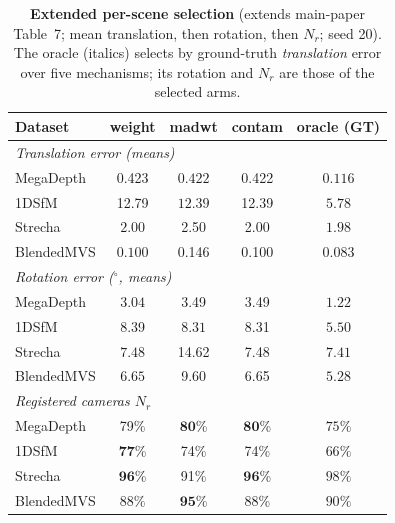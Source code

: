 \documentclass[10pt,twocolumn,letterpaper]{article}
\renewcommand{\deg}{^{\circ}}
\begin{document}
\begin{table}[t]\centering\footnotesize
\caption{\textbf{Extended per-scene selection} (extends main-paper Table~7; mean
translation, then rotation, then $N_r$; seed 20). The oracle (italics) selects by
ground-truth \emph{translation} error over five mechanisms; its rotation and $N_r$ are
those of the selected arms.}
\label{tab:x_selector}
\setlength{\tabcolsep}{3pt}%
\begin{tabular}{lcccc}
\toprule
Dataset & weight & madwt & contam & oracle (GT)\\
\midrule
\multicolumn{5}{l}{\emph{Translation error (means)}}\\[1pt]
MegaDepth  & 0.423 & $\mathbf{0.422}$ & 0.422 & $\mathit{0.116}$\\
1DSfM      & 12.79 & $\mathbf{12.39}$ & 12.39 & $\mathit{5.78}$\\
Strecha    & $\mathbf{2.00}$ & 2.50 & 2.00 & $\mathit{1.98}$\\
BlendedMVS & $\mathbf{0.100}$ & 0.146 & 0.100 & $\mathit{0.083}$\\
\midrule
\multicolumn{5}{l}{\emph{Rotation error ($\deg$, means)}}\\[1pt]
MegaDepth  & $\mathbf{3.04}$ & 3.49 & 3.49 & $\mathit{1.22}$\\
1DSfM      & 8.39 & $\mathbf{8.31}$ & 8.31 & $\mathit{5.50}$\\
Strecha    & $\mathbf{7.48}$ & 14.62 & 7.48 & $\mathit{7.41}$\\
BlendedMVS & $\mathbf{6.65}$ & 9.60 & 6.65 & $\mathit{5.28}$\\
\midrule
\multicolumn{5}{l}{\emph{Registered cameras $N_r$}}\\[1pt]
MegaDepth  & 79\% & $\mathbf{80}$\% & $\mathbf{80}$\% & $\mathit{75\%}$\\
1DSfM      & $\mathbf{77}$\% & 74\% & 74\% & $\mathit{66\%}$\\
Strecha    & $\mathbf{96}$\% & 91\% & $\mathbf{96}$\% & $\mathit{98\%}$\\
BlendedMVS & 88\% & $\mathbf{95}$\% & 88\% & $\mathit{90\%}$\\
\bottomrule
\end{tabular}
\end{table}
\end{document}
